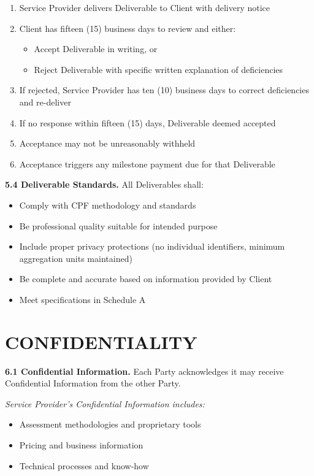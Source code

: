 \documentclass[11pt,a4paper]{article}
\begin{document}
\begin{enumerate}[label=\alph*)]
\item Service Provider delivers Deliverable to Client with delivery notice
\item Client has fifteen (15) business days to review and either:
\begin{itemize}
\item Accept Deliverable in writing, or
\item Reject Deliverable with specific written explanation of deficiencies
\end{itemize}
\item If rejected, Service Provider has ten (10) business days to correct deficiencies and re-deliver
\item If no response within fifteen (15) days, Deliverable deemed accepted
\item Acceptance may not be unreasonably withheld
\item Acceptance triggers any milestone payment due for that Deliverable
\end{enumerate}

\textbf{5.4 Deliverable Standards.} All Deliverables shall:
\begin{itemize}
\item Comply with CPF methodology and standards
\item Be professional quality suitable for intended purpose
\item Include proper privacy protections (no individual identifiers, minimum aggregation units maintained)
\item Be complete and accurate based on information provided by Client
\item Meet specifications in Schedule A
\end{itemize}

\section{CONFIDENTIALITY}

\textbf{6.1 Confidential Information.} Each Party acknowledges it may receive Confidential Information from the other Party.

\textit{Service Provider's Confidential Information includes:}
\begin{itemize}
\item Assessment methodologies and proprietary tools
\item Pricing and business information
\item Technical processes and know-how
\end{itemize}
\end{document}
